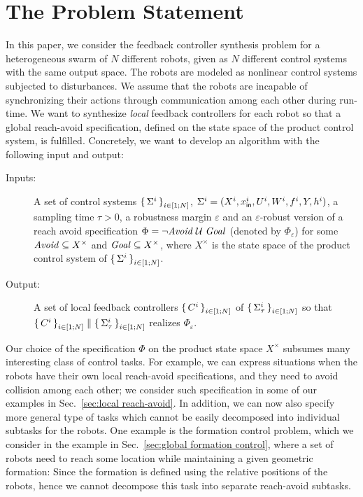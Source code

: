 
\section{The Problem Statement}
\label{sec:problem}
In this paper, we consider the feedback controller synthesis problem for a heterogeneous swarm of $N$ different robots, given as $N$ different control systems with the same output space.
The robots are modeled as nonlinear control systems subjected to disturbances.
We assume that the robots are incapable of synchronizing their actions through communication among each other during run-time.
We want to synthesize \emph{local} feedback controllers for each robot so that a global reach-avoid specification, defined on the state space of the product control system, is fulfilled.
Concretely, we want to develop an algorithm with the following input and output:
\begin{description}
	\item[Inputs:] A set of control systems $\set{\Sigma^i}_{i\in [1;N]}$, $\Sigma^i=(X^i,x_{\mathsf{in}}^i,U^i,W^i,f^i,Y,h^i)$, a sampling time $\tau >0$, a robustness margin $\varepsilon$ and an $\varepsilon$-robust version of a reach avoid specification $\Phi=\lnot\mathit{Avoid}\;\mathcal{U}\;\mathit{Goal}$ (denoted by $\Phi_\varepsilon$) for some $\mathit{Avoid}\subseteq X^\times$ and $\mathit{Goal}\subseteq X^\times$, where $X^\times$ is the state space of the product control system of $\set{\Sigma^i}_{i\in [1;N]}$.
	\item[Output:] A set of local feedback controllers $\set{C^i}_{i\in [1;N]}$ of $\set{\Sigma^i_\tau}_{i\in [1;N]}$ so that $\set{C^i}_{i\in [1;N]}\parallel \set{\Sigma_\tau^i}_{i\in [1;N]}$ realizes $\Phi_\varepsilon$. 
\end{description}

Our choice of the specification $\Phi$ on the product state space $X^\times$ subsumes many interesting class of control tasks.
For example, we can express situations when the robots have their own local reach-avoid specifications, and they need to avoid collision among each other; we consider such specification in some of our examples in Sec.~\ref{sec:local reach-avoid}.
In addition, we can now also specify more general type of tasks which cannot be easily decomposed into individual subtasks for the robots.
One example is the formation control problem, which we consider in the example in Sec.~\ref{sec:global formation control}, where a set of robots need to reach some location while maintaining a given geometric formation:
Since the formation is defined using the relative positions of the robots, hence we cannot decompose this task into separate reach-avoid subtasks.

